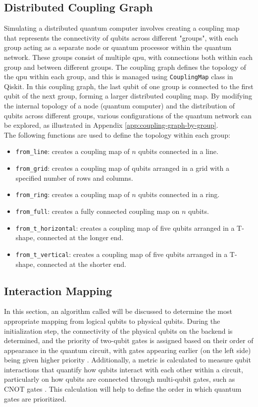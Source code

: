 \subsection{Distributed Coupling Graph} %
Simulating a distributed quantum computer involves creating a coupling map that represents the connectivity of qubits across different "groups", with each group acting as a separate node or quantum processor within the quantum network. These groups consist of multiple \acrfull{qpu}, with connections both within each group and between different groups. The coupling graph defines the topology of the \acrshort{qpu} within each group, and this is managed using \lstinline{CouplingMap} \cite{ibmquantum_couplingmap} class in Qiskit. In this coupling graph, the last qubit of one group is connected to the first qubit of the next group, forming a larger distributed coupling map. By modifying the internal topology of a node (quantum computer) and the distribution of qubits across different groups, various configurations of the quantum network can be explored, as illustrated in Appendix \ref{app:coupling-graph-by-group}. \\
The following functions are used to define the topology within each group:
\begin{itemize}[noitemsep,nolistsep]
    \item \lstinline{from_line}: creates a coupling map of $n$ qubits connected in a line.
    \item \lstinline{from_grid}: creates a coupling map of qubits arranged in a grid with a specified number of rows and columns.
    \item \lstinline{from_ring}: creates a coupling map of $n$ qubits connected in a ring.
    \item \lstinline{from_full}: creates a fully connected coupling map on $n$ qubits.
    \item \lstinline{from_t_horizontal}: creates a coupling map of five qubits arranged in a T-shape, connected at the longer end.
    \item \lstinline{from_t_vertical}: creates a coupling map of five qubits arranged in a T-shape, connected at the shorter end.
\end{itemize}

\subsection{Interaction Mapping} %
In this section, an algorithm called  will be discussed to determine the most appropriate mapping from logical qubits to physical qubits. During the initialization step, the connectivity of the physical qubits on the backend is determined, and the priority of two-qubit gates is assigned based on their order of appearance in the quantum circuit, with gates appearing earlier (on the left side) being given higher priority \cite{liu_qm-dla_2024}. Additionally, a metric is calculated to measure qubit interactions that quantify how qubits interact with each other within a circuit, particularly on how qubits are connected through multi-qubit gates, such as CNOT gates \cite{bandic_interaction_2023}. This calculation will help to define the order in which quantum gates are prioritized.

